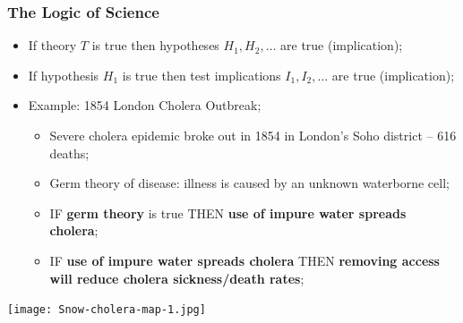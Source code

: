 \documentclass[aspectratio=169]{beamer}
\theoremstyle{principle}
\begin{document}
\begin{frame}
\frametitle{The Logic of Science}
\begin{itemize}
\item If theory $T$ is true then hypotheses $H_1, H_2,\hdots$ are true (implication);
\bigskip
\bigskip
\item If hypothesis $H_1$ is true then test implications $I_1,I_2,\hdots$ are true (implication);
\bigskip
\bigskip
\item Example: 1854 London Cholera Outbreak;
\begin{itemize}
\item Severe cholera epidemic broke out in 1854 in London's Soho district -- 616 deaths;
\item Germ theory of disease: illness is caused by an unknown waterborne cell;
\item IF \textbf{germ theory} is true THEN \textbf{use of impure water spreads cholera};
\item IF \textbf{use of impure water spreads cholera} THEN \textbf{removing access will reduce cholera sickness/death rates};
\end{itemize}
\end{itemize}

\end{frame}

\begin{frame}

\begin{center}
\texttt{[image: Snow-cholera-map-1.jpg]}
\end{center}

\end{frame}
\end{document}
